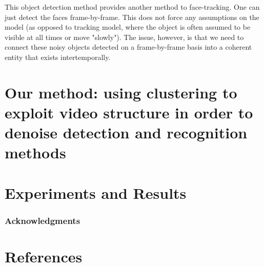 \documentclass{article}
\begin{document}
This object detection method provides another method to face-tracking. One can
just detect the faces frame-by-frame. This does not force any assumptions on
the model (as opposed to tracking model, where the object is often assumed to
be visible at all times or move "slowly"). The issue, however, is that we
need to connect these noisy objects detected on a frame-by-frame basis into
a coherent entity that exists intertemporally.

\section{Our method: using clustering to exploit video structure in order to denoise detection and recognition methods}


\section{Experiments and Results}

\subsubsection*{Acknowledgments}

\section*{References}



\end{document}
